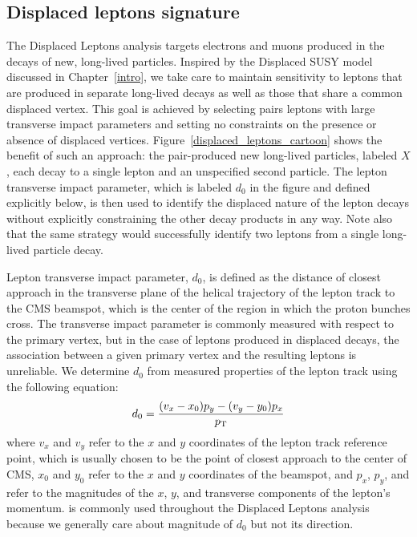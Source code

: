 \subsection{Displaced leptons signature}
The Displaced Leptons analysis targets electrons and muons produced in the decays of new, long-lived particles. Inspired by the Displaced SUSY model discussed in Chapter~\ref{intro}, we take care to maintain sensitivity to leptons that are produced in separate long-lived decays as well as those that share a common displaced vertex. This goal is achieved by selecting pairs leptons with large transverse impact parameters and setting no constraints on the presence or absence of displaced vertices. Figure~\ref{displaced_leptons_cartoon} shows the benefit of such an approach: the pair-produced new long-lived particles, labeled $X$, each decay to a single lepton and an unspecified second particle. The lepton transverse impact parameter, which is labeled $d_0$ in the figure and defined explicitly below, is then used to identify the displaced nature of the lepton decays without explicitly constraining the other decay products in any way. Note also that the same strategy would successfully identify two leptons from a single long-lived particle decay.



Lepton transverse impact parameter, $d_0$, is defined as the distance of closest approach in the transverse plane of the helical trajectory of the lepton track to the CMS beamspot, which is the center of the region in which the proton bunches cross. The transverse impact parameter is commonly measured with respect to the primary vertex, but in the case of leptons produced in displaced decays, the association between a given primary vertex and the resulting leptons is unreliable. We determine $d_0$ from measured properties of the lepton track using the following equation:
\begin{equation}
    d_0 = \frac{(v_x - x_0)p_y - (v_y - y_0)p_x}{p_{\mathrm{T}}}
\end{equation}
where $v_x$ and $v_y$ refer to the $x$ and $y$ coordinates of the lepton track reference point, which is usually chosen to be the point of closest approach to the center of CMS, $x_0$ and $y_0$ refer to the $x$ and $y$ coordinates of the beamspot, and $p_x$, $p_y$, and \pt refer to the magnitudes of the $x$, $y$, and transverse components of the lepton's momentum. \ad is commonly used throughout the Displaced Leptons analysis because we generally care about magnitude of $d_0$ but not its direction.

